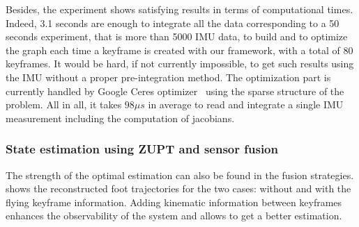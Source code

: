 Besides, the experiment shows satisfying results in terms of computational times. Indeed, 3.1 seconds are enough to integrate all the data corresponding to a 50 seconds experiment, that is more than 5000 IMU data, to build and to optimize the graph each time a keyframe is created with our framework,
with a total of 80 keyframes. It would be hard, if not currently impossible, to get such results using the IMU without a proper pre-integration method.
The optimization part is currently handled by Google Ceres optimizer~\cite{ceres-solver} using the sparse structure of the problem. All in all, it takes $98 \mu s$ in average to read and integrate a single IMU measurement including the computation of jacobians.

\subsubsection{State estimation using ZUPT and sensor fusion}

The strength of the optimal estimation can also be found in the fusion strategies. 
 shows the reconstructed foot trajectories for the two cases: without and with the flying keyframe information. Adding kinematic information between keyframes enhances the observability of the system and allows to get a better estimation.


